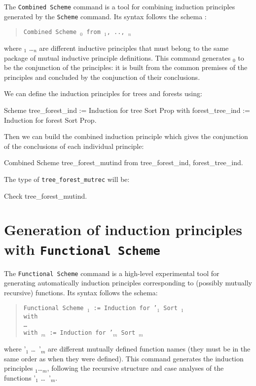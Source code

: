 The {\tt Combined Scheme} command is a tool for combining
induction principles generated by the {\tt Scheme} command.
Its syntax follows the schema :
\begin{quote}
{\tt Combined Scheme {\ident$_0$} from {\ident$_1$}, .., {\ident$_n$}}
\end{quote}
where
\ident$_1$ \ldots \ident$_n$ are different inductive principles that must belong to
the same package of mutual inductive principle definitions. This command
generates {\ident$_0$} to be the conjunction of the principles: it is
built from the common premises of the principles and concluded by the
conjunction of their conclusions.

\Example
We can define the induction principles for trees and forests using:
\begin{coq_example}
Scheme tree_forest_ind := Induction for tree Sort Prop
  with forest_tree_ind := Induction for forest Sort Prop.
\end{coq_example}

Then we can build the combined induction principle which gives the
conjunction of the conclusions of each individual principle:
\begin{coq_example}
Combined Scheme tree_forest_mutind from tree_forest_ind, forest_tree_ind.
\end{coq_example}

The type of {\tt tree\_forest\_mutrec} will be:
\begin{coq_example}
Check tree_forest_mutind.
\end{coq_example}

\section{Generation of induction principles with {\tt Functional Scheme}}
\label{FunScheme}

The {\tt Functional Scheme} command is a high-level experimental
tool for generating automatically induction principles
corresponding to (possibly mutually recursive) functions.  Its
syntax follows the schema:
\begin{quote}
{\tt Functional Scheme {\ident$_1$} := Induction for \ident'$_1$ Sort {\sort$_1$} \\
  with\\
  \mbox{}\hspace{0.1cm} \dots\ \\
        with {\ident$_m$} := Induction for {\ident'$_m$} Sort
        {\sort$_m$}}
\end{quote}
where \ident'$_1$ \dots\ \ident'$_m$ are different mutually defined function
names (they must be in the same order as when they were defined).
This command generates the induction principles
\ident$_1$\dots\ident$_m$, following the recursive structure and case
analyses of the functions \ident'$_1$ \dots\ \ident'$_m$.

